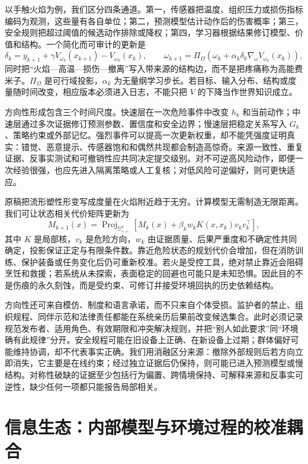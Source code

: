 以手触火焰为例，我们区分四条通道。第一，传感器把温度、组织压力或损伤指标编码为观测，这些量有各自单位；第二，预测模型估计动作后的伤害概率；第三，安全规则把超过阈值的候选动作排除或降权；第四，学习器根据结果修订模型、价值和结构。一个简化而可审计的更新是
\[
\delta_k=y_{k+1}+\gamma V_{\omega_k}(x_{k+1})-V_{\omega_k}(x_k),\qquad
\omega_{k+1}=\Pi_{\Omega}\left(\omega_k+\alpha_k\delta_k\nabla_{\omega}V_{\omega_k}(x_k)\right),
\]
同时把“火焰—高温—损伤—撤离”写入带来源的结构边，而不是把疼痛称为高能费米子。$\Pi_\Omega$ 是可行域投影，$\alpha_k$ 为无量纲学习步长。若目标、输入分布、结构或度量随时间改变，相应版本必须进入日志，不能只把 $V$ 的下降当作世界知识成立。

方向性形成包含三个时间尺度。快速层在一次危险事件中改变 $h_k$ 和当前动作；中速层通过多次证据修订预测参数、置信度和安全边界；慢速层把稳定关系写入 $G_k$、策略约束或外部记忆。强烈事件可以提高一次更新权重，却不能凭强度证明真实：错觉、恶意提示、传感器饱和和偶然共现都会制造高惊奇。来源一致性、重复证据、反事实测试和可撤销性应共同决定提交级别。对不可逆高风险动作，即便一次经验很强，也应先进入隔离策略或人工复核；对低风险可逆偏好，则可更快适应。

原稿把流形塑性形变写成度量在火焰附近趋于无穷。计算模型无需制造无限距离。我们可让状态相关代价矩阵更新为
\[
M_{k+1}(x)=\operatorname{Proj}_{\mathbb S_{++}^{d}}
\left[M_k(x)+\beta_k w_k K(x,x_k)v_kv_k^{\top}\right],
\]
其中 $K$ 是局部核，$v_k$ 是危险方向，$w_k$ 由证据质量、后果严重度和不确定性共同确定，投影保证正定与有限条件数。靠近危险状态的规划代价会增加，但在消防训练、保护装备或任务变化后仍可重新校准。若火是受控工具，绝对禁止靠近会阻碍烹饪和救援；若系统从未探索，表面稳定的回避也可能只是未知恐惧。因此目的不是伤痕的永久刻蚀，而是受约束、可修订并接受环境回执的历史依赖结构。

方向性还可来自模仿、制度和语言承诺，而不只来自个体受损。监护者的禁止、组织规程、同伴示范和法律责任都能在系统亲历后果前改变候选集合。此时必须记录规范发布者、适用角色、有效期限和冲突解决规则，并把“别人如此要求”同“环境确有此规律”分开。安全规程可能在旧设备上正确、在新设备上过期；群体偏好可能维持协调，却不代表事实正确。我们用消融区分来源：撤除外部规则后若方向立即消失，它主要是在线约束；经过独立证据后仍保持，则可能已进入预测模型或慢结构。对称性破缺的证据至少包括行为偏置、跨情境保持、可解释来源和反事实可逆性，缺少任何一项都只能报告局部相关。

\section{信息生态：内部模型与环境过程的校准耦合}
\label{sec:section_2714}

